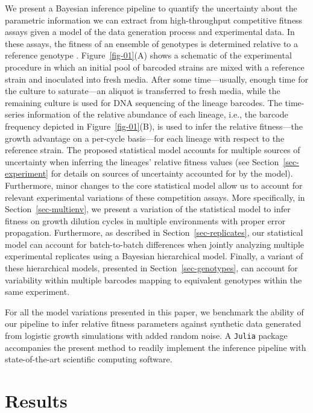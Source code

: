 \documentclass[
]{scrartcl}
\begin{document}
\begin{refsegment}
We present a Bayesian inference pipeline to quantify the uncertainty
about the parametric information we can extract from high-throughput
competitive fitness assays given a model of the data generation process
and experimental data. In these assays, the fitness of an ensemble of
genotypes is determined relative to a reference genotype
\autocite{kinsler2020,ascensao2023}. Figure~\ref{fig-01}(A) shows a
schematic of the experimental procedure in which an initial pool of
barcoded strains are mixed with a reference strain and inoculated into
fresh media. After some time---usually, enough time for the culture to
saturate---an aliquot is transferred to fresh media, while the remaining
culture is used for DNA sequencing of the lineage barcodes. The
time-series information of the relative abundance of each lineage, i.e.,
the barcode frequency depicted in Figure~\ref{fig-01}(B), is used to
infer the relative fitness---the growth advantage on a per-cycle
basis---for each lineage with respect to the reference strain. The
proposed statistical model accounts for multiple sources of uncertainty
when inferring the lineages' relative fitness values (see
Section~\ref{sec-experiment} for details on sources of uncertainty
accounted for by the model). Furthermore, minor changes to the core
statistical model allow us to account for relevant experimental
variations of these competition assays. More specifically, in
Section~\ref{sec-multienv}, we present a variation of the statistical
model to infer fitness on growth dilution cycles in multiple
environments with proper error propagation. Furthermore, as described in
Section~\ref{sec-replicates}, our statistical model can account for
batch-to-batch differences when jointly analyzing multiple experimental
replicates using a Bayesian hierarchical model. Finally, a variant of
these hierarchical models, presented in Section~\ref{sec-genotypes}, can
account for variability within multiple barcodes mapping to equivalent
genotypes within the same experiment.

For all the model variations presented in this paper, we benchmark the
ability of our pipeline to infer relative fitness parameters against
synthetic data generated from logistic growth simulations with added
random noise. A \texttt{Julia} package accompanies the present method to
readily implement the inference pipeline with state-of-the-art
scientific computing software.

\hypertarget{results}{%
\section{Results}\label{results}}


\end{refsegment}
\end{document}
